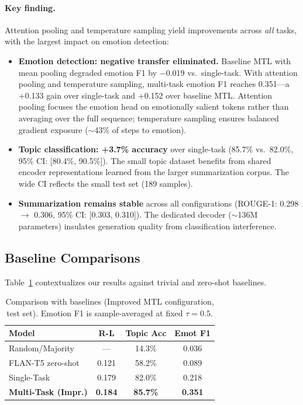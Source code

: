 \documentclass[11pt]{article}
\begin{document}
\paragraph{Key finding.} Attention pooling and temperature sampling yield improvements across \textit{all} tasks, with the largest impact on emotion detection:

\begin{itemize}
    \item \textbf{Emotion detection: negative transfer eliminated.} Baseline MTL with mean pooling degraded emotion F1 by $-$0.019 vs.\ single-task. With attention pooling and temperature sampling, multi-task emotion F1 reaches 0.351---a +0.133 gain over single-task and +0.152 over baseline MTL. Attention pooling focuses the emotion head on emotionally salient tokens rather than averaging over the full sequence; temperature sampling ensures balanced gradient exposure ($\sim$43\% of steps to emotion).

    \item \textbf{Topic classification: +3.7\% accuracy} over single-task (85.7\% vs.\ 82.0\%, 95\% CI: [80.4\%, 90.5\%]). The small topic dataset benefits from shared encoder representations learned from the larger summarization corpus. The wide CI reflects the small test set (189 samples).

    \item \textbf{Summarization remains stable} across all configurations (ROUGE-1: 0.298 $\rightarrow$ 0.306, 95\% CI: [0.303, 0.310]). The dedicated decoder ($\sim$136M parameters) insulates generation quality from classification interference.
\end{itemize}

\subsection{Baseline Comparisons}
\label{sec:baseline_discussion}

Table~\ref{tab:baselines} contextualizes our results against trivial and zero-shot baselines.

\begin{table}[t]
\centering
\caption{Comparison with baselines (Improved MTL configuration, test set). Emotion F1 is sample-averaged at fixed $\tau=0.5$.}
\label{tab:baselines}
\small
\setlength{\tabcolsep}{4pt}
\begin{tabular}{lccc}
\toprule
\textbf{Model} & \textbf{R-L} & \textbf{Topic Acc} & \textbf{Emot F1} \\
\midrule
Random/Majority & --- & 14.3\% & 0.036 \\
FLAN-T5 zero-shot & 0.121 & 58.2\% & 0.089 \\
Single-Task & 0.179 & 82.0\% & 0.218 \\
\textbf{Multi-Task (Impr.)} & \textbf{0.184} & \textbf{85.7\%} & \textbf{0.351} \\
\bottomrule
\end{tabular}
\end{table}
\end{document}
